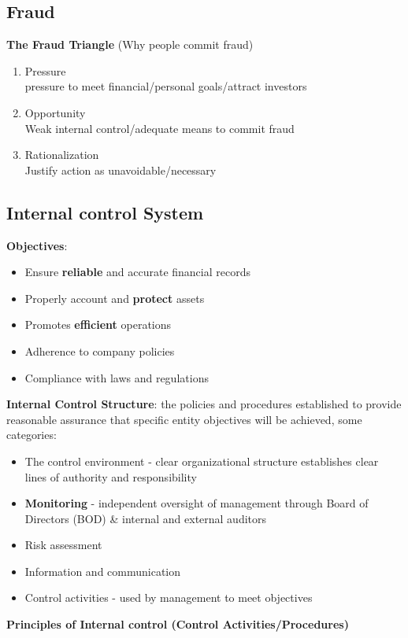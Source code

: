 \documentclass{article}
\begin{document}
\begin{multicols}{2}
\subsection{Fraud}
\textbf{The Fraud Triangle} (Why people commit fraud)
\begin{enumerate}
	\item Pressure\\
	pressure to meet financial/personal goals/attract investors
	\item Opportunity\\
	Weak internal control/adequate means to commit fraud
	\item Rationalization\\
	Justify action as unavoidable/necessary
\end{enumerate}

\subsection{Internal control System}
\textbf{Objectives}:
\begin{itemize}
	\item Ensure \textbf{reliable} and accurate financial records
	\item Properly account and \textbf{protect} assets
	\item Promotes \textbf{efficient} operations
	\item Adherence to company policies
	\item Compliance with laws and regulations
\end{itemize}
\textbf{Internal Control Structure}: the policies and procedures established to provide reasonable assurance that specific entity objectives will be achieved, some categories:
\begin{itemize}
	\item The control environment - clear organizational structure establishes clear lines of authority and responsibility
	\item \textbf{Monitoring} - independent oversight of management through Board of Directors (BOD) \& internal and external auditors
	\item Risk assessment
	\item Information and communication
	\item Control activities - used by management to meet objectives
\end{itemize}
\textbf{Principles of Internal control (Control Activities/Procedures)}
\begin{itemize}

\end{itemize}
\end{multicols}
\end{document}

